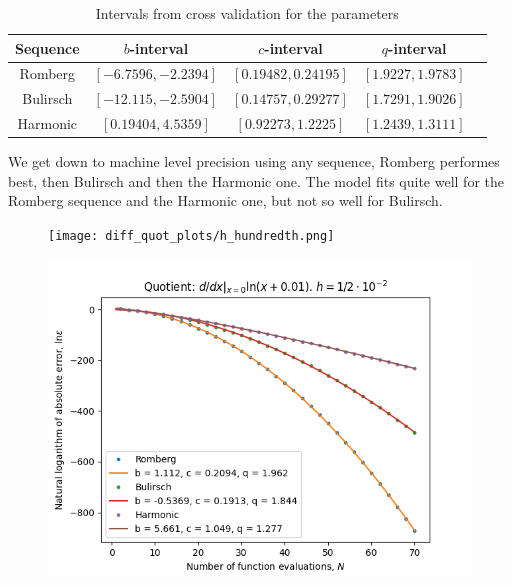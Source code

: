 \begin{table}[H]
    \centering
    \begin{tabular}{c|c||c|c|c}
Sequence & \(b\)-interval & \(c\)-interval & \(q\)-interval\\\hline\hline
Romberg &\([-6.7596, -2.2394]\) & \([0.19482, 0.24195]\) & \([1.9227, 1.9783]\)\\
Bulirsch & \([-12.115, -2.5904]\) & \([0.14757, 0.29277]\) & \([1.7291, 1.9026]\)\\
Harmonic & \([0.19404, 4.5359]\) & \([0.92273, 1.2225]\) & \([1.2439, 1.3111]\)\\
    \end{tabular}
    \caption{Intervals from cross validation for the parameters}
    \label{tab:my_label}
\end{table}

We get down to machine level precision using any sequence, Romberg performes best, then Bulirsch and then the Harmonic one. The model fits quite well for the Romberg sequence and the Harmonic one, but not so well for Bulirsch.

\begin{figure}[H]
\centering
\begin{minipage}{0.45\textwidth}
\centering
\texttt{[image: diff\_quot\_plots/h\_hundredth.png]}
\end{minipage}
\begin{minipage}{0.45\textwidth}
\centering
\includegraphics[scale=0.45]{diff_quot_plots/h_hundredth_hp_trend.png}
\end{minipage}
\end{figure}

